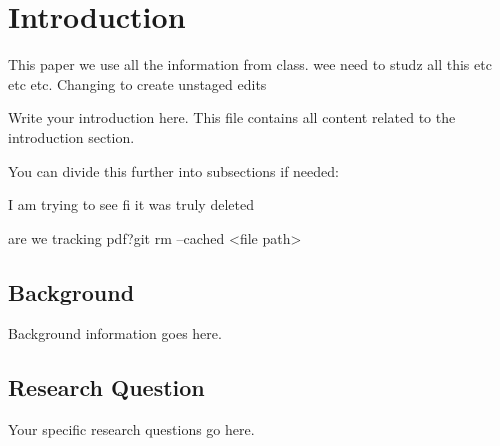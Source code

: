\section{Introduction}
\label{sec:introduction}

This paper we use all the information from class.
wee need to studz all this etc etc etc. Changing to create unstaged edits

Write your introduction here. This file contains all content related to the introduction section.

You can divide this further into subsections if needed:


I am trying to see fi it was truly deleted


are we tracking pdf?git rm --cached <file path>

\subsection{Background}
Background information goes here.

\subsection{Research Question}
Your specific research questions go here.